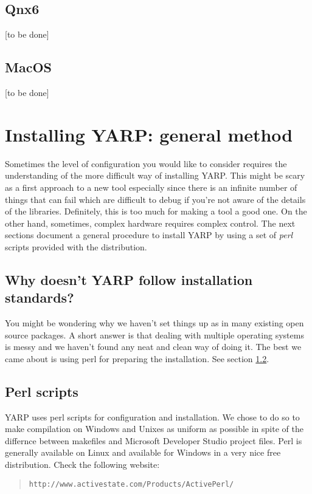 \subsection{Qnx6}
[to be done]

\subsection{MacOS}
[to be done]


\section{Installing YARP: general method}
Sometimes the level of configuration you would like to consider requires the understanding of the more difficult way of installing YARP. This might be scary as a first approach to a new tool especially since there is an infinite number of things that can fail which are difficult to debug if you're not aware of the details of the libraries. Definitely, this is too much for making a tool a good one. On the other hand, sometimes, complex hardware requires complex control. The next sections document a general procedure to install YARP by using a set of {\em perl} scripts provided with the distribution.

\subsection{Why doesn't YARP follow installation standards?}
You might be wondering why we haven't set things up as in many existing open source packages. A short answer is that dealing with multiple operating systems is messy and we haven't found any neat and clean way of doing it. The best we came about is using perl for preparing the installation. See section \ref{sect:perl}.

\subsection{Perl scripts}
\label{sect:perl}

YARP uses perl scripts for configuration and installation. We chose to do so to make compilation on Windows and Unixes as uniform as possible in spite of the differnce between makefiles and Microsoft Developer Studio project files. Perl is generally available on Linux and available for Windows in a very nice free distribution. Check the following website:

\begin{quote}
{\tt http://www.activestate.com/Products/ActivePerl/}
\end{quote}


